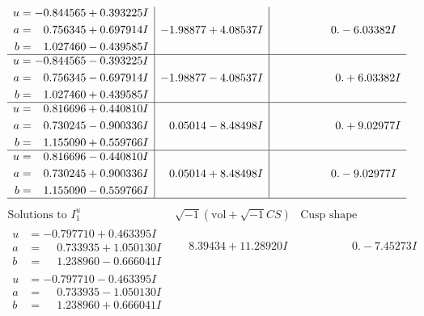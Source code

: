 \documentclass[1p]{elsarticle_modified}
\theoremstyle{definition}
\newcommand{\I}{\sqrt{-1}}
\begin{document}
$$\begin{array}{c|c|c}
\begin{aligned}
u &= -0.844565 + 0.393225 I \\
a &= \phantom{-}0.756345 + 0.697914 I \\
b &= \phantom{-}1.027460 - 0.439585 I\end{aligned}
 & -1.98877 + 4.08537 I & \phantom{-0.000000 } 0. - 6.03382 I \\ \hline\begin{aligned}
u &= -0.844565 - 0.393225 I \\
a &= \phantom{-}0.756345 - 0.697914 I \\
b &= \phantom{-}1.027460 + 0.439585 I\end{aligned}
 & -1.98877 - 4.08537 I & \phantom{-0.000000 -}0. + 6.03382 I \\ \hline\begin{aligned}
u &= \phantom{-}0.816696 + 0.440810 I \\
a &= \phantom{-}0.730245 - 0.900336 I \\
b &= \phantom{-}1.155090 + 0.559766 I\end{aligned}
 & \phantom{-}0.05014 - 8.48498 I & \phantom{-0.000000 -}0. + 9.02977 I \\ \hline\begin{aligned}
u &= \phantom{-}0.816696 - 0.440810 I \\
a &= \phantom{-}0.730245 + 0.900336 I \\
b &= \phantom{-}1.155090 - 0.559766 I\end{aligned}
 & \phantom{-}0.05014 + 8.48498 I & \phantom{-0.000000 } 0. - 9.02977 I\\
 \hline 
 \end{array}$$\newpage$$\begin{array}{c|c|c}  
\text{Solutions to }I^u_{1}& \I (\text{vol} + \sqrt{-1}CS) & \text{Cusp shape}\\
 \hline 
\begin{aligned}
u &= -0.797710 + 0.463395 I \\
a &= \phantom{-}0.733935 + 1.050130 I \\
b &= \phantom{-}1.238960 - 0.666041 I\end{aligned}
 & \phantom{-}8.39434 + 11.28920 I & \phantom{-0.000000 } 0. - 7.45273 I \\ \hline\begin{aligned}
u &= -0.797710 - 0.463395 I \\
a &= \phantom{-}0.733935 - 1.050130 I \\
b &= \phantom{-}1.238960 + 0.666041 I\end{aligned}

\end{array}$$
\end{document}
